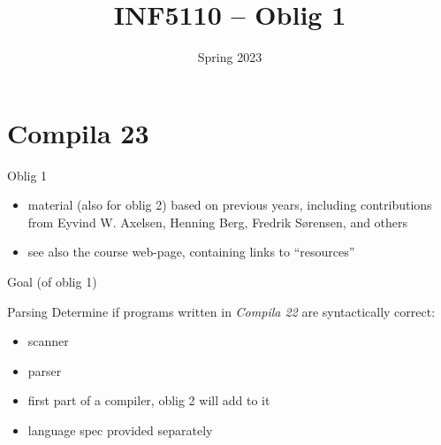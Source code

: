 \documentclass{beamer}
\date{Spring 2023}
\title{INF5110 -- Oblig  1}
\renewcommand{\maketitle}{}
\begin{document}
\maketitle
\section{Compila 23}
\label{sec:orgc25142d}

\begin{frame}[label={sec:org503d865}]{Oblig 1}
\begin{itemize}
\item material (also for oblig 2) based on previous years, including contributions from Eyvind
W. Axelsen, Henning Berg, Fredrik Sørensen, and others
\end{itemize}


\begin{itemize}
\item see also the course web-page, containing links to ``resources''
\end{itemize}
\end{frame}


\begin{frame}[label={sec:org11348e6}]{Goal (of oblig 1)}
\begin{block}{Parsing}
Determine if programs written in \emph{Compila 22} are syntactically correct: 

\begin{itemize}
\item scanner
\item parser
\end{itemize}
\end{block}


\begin{itemize}
\item first part of a compiler, oblig 2 will add to it
\item language spec provided separately
\end{itemize}
\end{frame}
\end{document}
